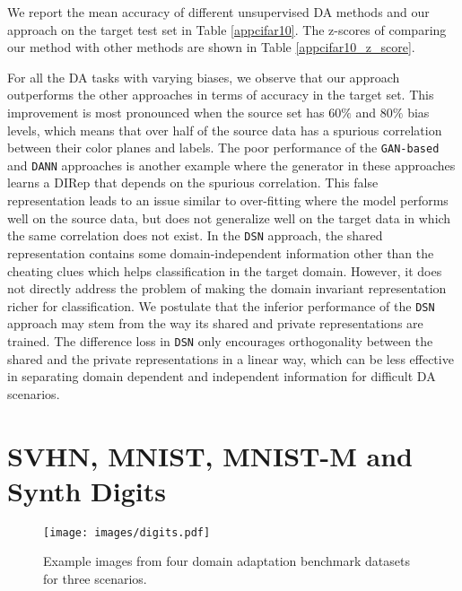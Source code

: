 \documentclass{article}
\newcommand\todo[1]{\textcolor{red}{#1}}
\begin{document}
We report the mean accuracy of different unsupervised DA methods and our approach on the target test set in Table \ref{appcifar10}. The z-scores of comparing our method with other methods are shown in Table \ref{appcifar10_z_score}. 

For all the DA tasks with varying biases, we observe that our approach outperforms the other approaches in terms of accuracy in the target set. This improvement is most pronounced when the source set has $60\%$ and $80\%$ bias levels, which means that over half of the source data has a spurious correlation between their color planes and labels. The poor performance of the \verb"GAN-based" and \verb"DANN" approaches is another example where the generator in these approaches learns a DIRep that depends on the spurious correlation. This false representation leads to an issue similar to over-fitting where the model performs well on the source data, but does not generalize well on the target data in which the same correlation does not exist. In the \verb"DSN" approach, the shared representation contains some domain-independent information other than the cheating clues which helps classification in the target domain. However, it does not directly address the problem of making the domain invariant representation richer for classification. %
We postulate that the inferior performance of the \verb"DSN" approach may stem from the way its shared and private representations are trained. The difference loss in \verb"DSN" only encourages orthogonality between the shared and the private representations in a linear way, which can be less effective in separating domain dependent and independent information for difficult DA scenarios. 





\section{SVHN, MNIST, MNIST-M and Synth Digits}\label{digitspairs}


\begin{figure}[t]
\center
\texttt{[image: images/digits.pdf]}
\caption{Example images from four domain adaptation benchmark datasets for three scenarios.}
\label{digits} 
\end{figure}
\end{document}
